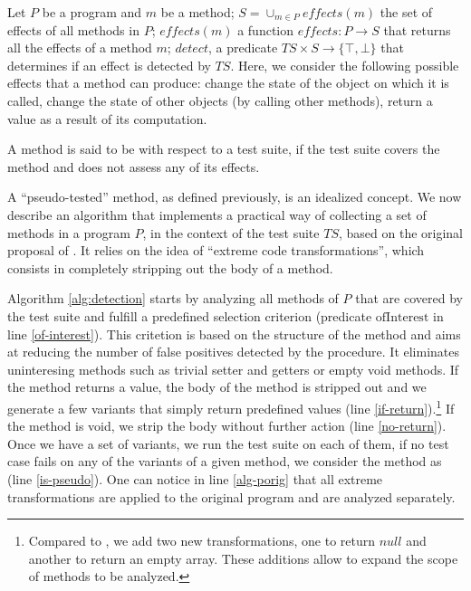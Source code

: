 Let $P$ be a program and $m$ be a method; $S=\cup_{m \in P}{\mathit{effects}(m)}$ the set of effects of all methods in $P$; 
$\mathit{effects}(m)$ a function $\mathit{effects}:P \rightarrow S$ that returns all the effects of a method $m$; $detect$, a predicate $TS \times S \rightarrow \{\top, \bot\}$ that determines if an effect is detected by $TS$.
Here, we consider the following possible effects that a method can produce: 
change the state of the object on which it is called, change the state of other objects (by calling other methods), return a value as a result of its computation.

\begin{definition}
	\label{def:pseudo}
	A method is said to be \pseudotested{} with respect to a test suite, if the test suite covers the method and does not assess any of its effects.
\end{definition}

A ``pseudo-tested'' method, as defined previously, is an idealized concept.
We now describe an algorithm that implements a practical way of collecting a set of \pseudotested{} methods in a program $P$, in the context of the test suite $TS$, based on the original proposal of \theoriginalauthors. 
It relies on the idea of ``extreme code transformations'', which consists in completely stripping out the body of a method.

Algorithm \autoref{alg:detection} starts by analyzing all methods of $P$ that are covered by the test suite and fulfill a predefined selection criterion (predicate $\mathrm{ofInterest}$ in line \ref{of-interest}).
This critetion is based on the structure of the method and aims at reducing the number of false positives detected by the procedure. 
It eliminates uninteresing methods such as trivial setter and getters or empty void methods.
If the method returns a value, the body of the method is stripped out and we generate a few variants that simply return predefined values (line \ref{if-return}).\footnote{Compared to \theoriginalauthors, we add two new transformations, one to return $null$ and another to return an empty array. These additions allow to expand the scope of methods to be analyzed.}
If the method is void, we strip the body without further action (line \ref{no-return}).
Once we have a set of variants, we run the test suite on each of them, if no test case fails on any of the variants of a given method, we consider the method as \pseudotested{} (line \ref{is-pseudo}). 
One can notice in line \ref{alg-porig} that all extreme transformations are applied to the original program and are analyzed separately.

